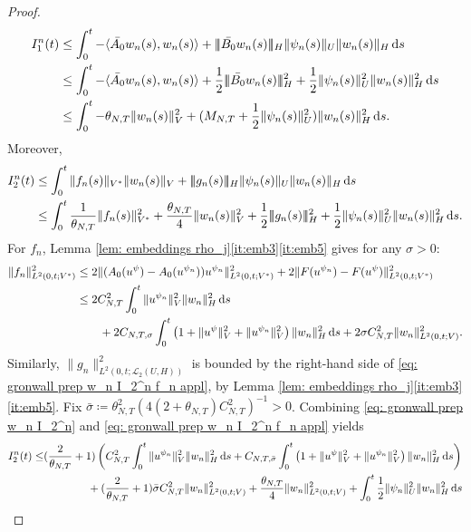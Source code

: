 \documentclass{amsart}
\newcommand{\dd}{\,\mathrm{d}}
\newcommand{\UH}{\mathcal{L}_2(U,H)}
\newcommand{\<}{\langle}
\newcommand{\?}{\rangle}
\newcommand{\nn}{|\!|\!|}
\theoremstyle{plain}
\theoremstyle{remark}
\theoremstyle{plain}
\numberwithin{equation}{section}
\begin{document}
\begin{proof}
\begin{align}\label{eq: gronwall prep w_n I_1^n}
  I_1^n(t)&\leq \int_0^t-\<\bar{A_0}w_n(s),w_n(s)\?+\nn\bar{B_0}w_n(s)\nn_H\|\psi_n(s)\|_U\|w_n(s)\|_H\dd s \notag\\
  &\leq \int_0^t-\<\bar{A_0}w_n(s),w_n(s)\?+\frac{1}{2}\nn\bar{B_0}w_n(s)\nn_H^2+\frac{1}{2}\|\psi_n(s)\|_U^2\|w_n(s)\|_H^2\dd s \notag\\
  &\leq \int_0^t-\theta_{N,T}\|w_n(s)\|_V^2+(M_{N,T}+\frac{1}{2}\|\psi_n(s)\|_U^2)\|w_n(s)\|_H^2\dd s.
\end{align}
Moreover,
\begin{align}\label{eq: gronwall prep w_n I_2^n}
  I_2^n(t)&\leq \int_0^t\|f_n(s)\|_{V^*}\|w_n(s)\|_V+\nn g_n(s)\nn_H\|\psi_n(s)\|_U\|w_n(s)\|_H\dd s\notag\\
  &\leq \int_0^t\frac{1}{\theta_{N,T}}\|f_n(s)\|_{V^*}^2+\frac{\theta_{N,T}}{4}\|w_n(s)\|_V^2+\frac{1}{2}\nn g_n(s)\nn_H^2+\frac{1}{2}\|\psi_n(s)\|_U^2\|w_n(s)\|_H^2\dd s.
\end{align}
For $f_n$, Lemma \ref{lem: embeddings rho_j}\ref{it:emb3}\ref{it:emb5} gives for any $\sigma>0$:
\begin{align}\label{eq: gronwall prep w_n I_2^n f_n appl}
\|f_n\|_{L^2(0,t;V^*)}^2&\leq 2\|(A_0 (u^\psi)-A_0 (u^{\psi_n}))u^{\psi_n}\|_{L^2(0,t;V^*)}^2+2\|F(u^{\psi_n})-F(u^{\psi}) \|_{L^2(0,t;V^*)}^2\notag\\
&\leq 2C_{N,T}^2\int_0^t\|u^{\psi_n}\|_V^2\|w_n\|_H^2\dd s\\
&\qquad+2C_{N,T,\sigma}\int_0^t\left(1+\|u^\psi\|_{V}^2+\|u^{\psi_n}\|_{V}^2\right)\|w_n\|_{H}^2\dd s+2\sigma C_{N,T}^2\|w_n\|_{L^2(0,t;V)}^2.\notag
\end{align}
Similarly, $\|g_n\|_{L^2(0,t;\UH)}^2$ is bounded by the right-hand side of  \eqref{eq: gronwall prep w_n I_2^n f_n appl}, by Lemma \ref{lem: embeddings rho_j}\ref{it:emb3}\ref{it:emb5}.
Fix $\bar{\sigma}\coloneqq  \theta_{N,T}^2(4(2+\theta_{N,T})C_{N,T}^2)^{-1}>0$.
Combining \eqref{eq: gronwall prep w_n I_2^n} and \eqref{eq: gronwall prep w_n I_2^n f_n appl} yields
\begin{align}\label{eq: gronwall prep w_n I_2^n final}
  I_2^n(t) \leq &(\frac{2}{\theta_{N,T}}+1)\left(C_{N,T}^2\int_0^t\|u^{\psi_n}\|_V^2\|w_n\|_H^2\dd s
+C_{N,T,\bar{\sigma}}\int_0^t\left(1+\|u^\psi\|_{V}^2+\|u^{\psi_n}\|_{V}^2\right)\|w_n\|_{H}^2\dd s\right)\notag\\
&\qquad\qquad+(\frac{2}{\theta_{N,T}}+1)\bar{\sigma} C_{N,T}^2\|w_n\|_{L^2(0,t;V)}^2+\frac{\theta_{N,T}}{4}\|w_n\|_{L^2(0,t;V)}^2+\int_0^t\frac{1}{2}\|\psi_n\|_U^2\|w_n\|_H^2\dd s\notag\\

\end{align}
\end{proof}
\end{document}
